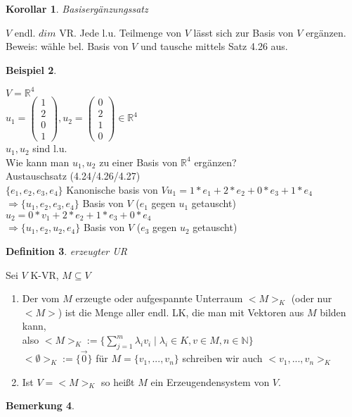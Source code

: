 \documentclass[a4paper,11pt]{article}
\newtheorem{definition}{Definition}[section]
\newtheorem{bsp}[definition]{Beispiel}
\newtheorem{bem}[definition]{Bemerkung}
\newtheorem{koro}[definition]{Korollar}
\begin{document}
\newpage
\begin{koro}
Basisergänzungssatz
\end{koro}
$V$ endl. $dim$ VR. Jede l.u. Teilmenge von $V$ lässt sich zur Basis von $V$ ergänzen. \\
Beweis: wähle bel. Basis von $V$ und tausche mittels Satz 4.26 aus.
\begin{bsp}
\end{bsp}
$V=\mathbb{R}^4$ \\
$u_1=\begin{pmatrix}1\\2\\0\\1\end{pmatrix}, u_2=\begin{pmatrix}0\\2\\1\\0\end{pmatrix}\in\mathbb{R}^4$ \\
$u_1,u_2$ sind l.u. \\
Wie kann man $u_1,u_2$ zu einer Basis von $\mathbb{R}^4$ ergänzen? \\
Austauschsatz (4.24/4.26/4.27) \\
$\{e_1,e_2,e_3,e_4\}$ Kanonische basis von $V$\hspace{5mm}$u_1=1*e_1+2*e_2+0*e_3+1*e_4$ \\
$\Rightarrow \{u_1,e_2,e_3,e_4\}$ Basis von $V$ ($e_1$ gegen $u_1$ getauscht) \\
$u_2=0*v_1+2*e_2+1*e_3+0*e_4$ \\
$\Rightarrow \{u_1,e_2,u_2,e_4\}$ Basis von $V$ ($e_3$ gegen $u_2$ getauscht)
\begin{definition}
erzeugter UR
\end{definition}
Sei $V$ K-VR, $M\subseteq V$
\begin{enumerate}[label=\alph*)]
\item Der vom $M$ erzeugte oder aufgespannte Unterraum $<M>_K$ (oder nur $<M>$) ist die Menge aller endl. LK, die man mit Vektoren aus $M$ bilden kann, \\
also $<M>_K:=\{\sum^m_{j=1}\lambda_iv_i\mid\lambda_i\in K, v\in M, n\in\mathbb{N}\}$ \\
$<\emptyset>_K:=\{\overset{\rightarrow}{0}\}$ für $M=\{v_1,...,v_n\}$ schreiben wir auch $<v_1,...,v_n>_K$
\item Ist $V=<M>_K$ so heißt $M$ ein Erzeugendensystem von $V$.
\end{enumerate}
\begin{bem}
\end{bem}
\end{document}

